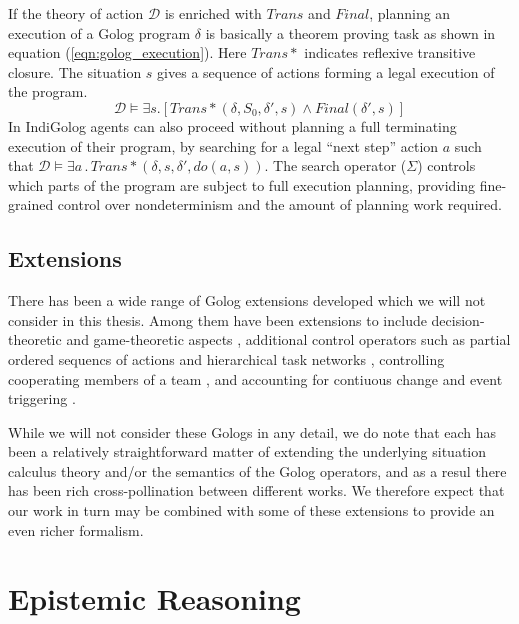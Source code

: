 If the theory of action $\mathcal{D}$ is enriched with $Trans$ and
$Final$, planning an execution of a Golog program $\delta$ is basically
a theorem proving task as shown in equation (\ref{eqn:golog_execution}).
Here $Trans*$ indicates reflexive transitive closure. The situation
$s$ gives a sequence of actions forming a legal execution of the
program.\begin{equation}
\mathcal{D}\models\exists s.\left[Trans*(\delta,S_{0},\delta',s)\wedge Final(\delta',s)\right]\label{eqn:Background:golog_execution}\end{equation}
 In IndiGolog agents can also proceed without planning a full terminating
execution of their program, by searching for a legal {}``next step''
action $a$ such that $\mathcal{D}\models\exists a\,.\, Trans*(\delta,s,\delta',do(a,s))$.
The search operator ($\Sigma$) controls which parts of the program
are subject to full execution planning, providing fine-grained control
over nondeterminism and the amount of planning work required.


\subsection{Extensions}

There has been a wide range of Golog extensions developed which we
will not consider in this thesis. Among them have been extensions
to include decision-theoretic \citep{boutilier00dtgolog} and game-theoretic
aspects \citep{finzi03gtgolog,finzi05pogtgolog}, additional control
operators such as partial ordered sequencs of actions \citep{son00htn_golog}
and hierarchical task networks \citep{Gabaldon02htn_in_golog,Son04golog+htn+time},
controlling cooperating members of a team \citep{farinelli07team_golog},
and accounting for contiuous change and event triggering \citep{grosskreutz00ccgolog}.

While we will not consider these Gologs in any detail, we do note
that each has been a relatively straightforward matter of extending
the underlying situation calculus theory and/or the semantics of the
Golog operators, and as a resul there has been rich cross-pollination
between different works. We therefore expect that our work in turn
may be combined with some of these extensions to provide an even richer
formalism.


\section{Epistemic Reasoning\label{sec:Background:Epistemic-Reasoning}}

